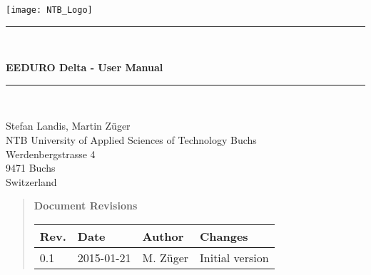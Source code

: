 




\begin{titlepage}
	\texttt{[image: NTB\_Logo]}
	\vspace{4.5cm}
	{
		\selectfont
	
		\rule{\linewidth}{0.5mm} \\[0cm]
	
		\begin{center}
			{\huge \bfseries EEDURO Delta - User Manual} \\
		\end{center}
		
		\rule{\linewidth}{0.5mm} \\[0.4cm]
		
		\vspace{1.5cm}
		
		Stefan Landis, Martin Züger \\
		
		
		NTB University of Applied Sciences of Technology Buchs\\
		Werdenbergstrasse 4\\
		9471 Buchs\\
		Switzerland\\
		\vfill
	}
\end{titlepage}
\clearpage

\begin{abstract}

\begin{large}
 \textbf{Document Revisions}
\end{large}

\begin{tabular}{|l|l|l|p{10cm}|}
\hline
\textbf{Rev.} & \textbf{Date} & \textbf{Author} & \textbf{Changes} \\
\hline
0.1 & 2015-01-21 & M. Züger & Initial version \\
\hline
\end{tabular} 

\end{abstract}
\setcounter{page}{1}
\setcounter{tocdepth}{2}
\tableofcontents

